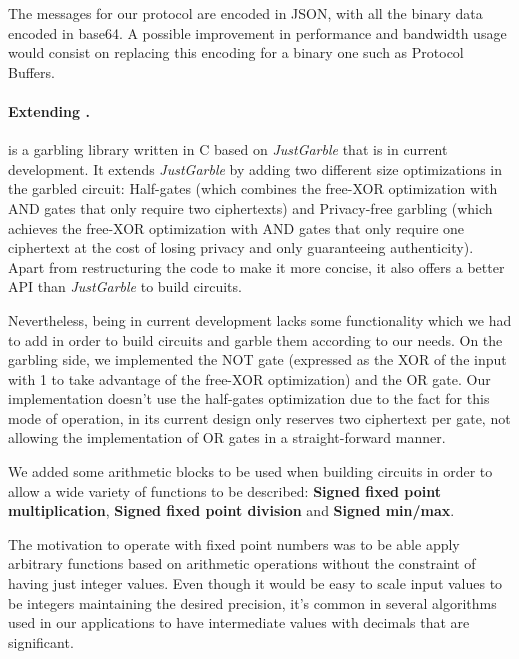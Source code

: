 The \MQTT{} messages for our protocol are encoded in JSON, with all the binary
data encoded in base64.  A possible improvement in performance and bandwidth
usage would consist on replacing this encoding for a binary one such as
Protocol Buffers.


\paragraph{Extending \libgarble.}

\libgarble{} is a garbling library written in C based on \emph{JustGarble} that
is in current development.  It extends \emph{JustGarble} by adding two
different size optimizations in the garbled circuit: Half-gates (which combines
the free-XOR optimization with AND gates that only require two ciphertexts) and
Privacy-free garbling (which achieves the free-XOR optimization with AND gates
that only require one ciphertext at the cost of losing privacy and only
guaranteeing authenticity).  Apart from restructuring the code to make it more
concise, it also offers a better API than \emph{JustGarble} to build circuits.

Nevertheless, \libgarble{} being in current development lacks some
functionality which we had to add in order to build circuits and garble them
according to our needs.  On the garbling side, we implemented the NOT gate
(expressed as the XOR of the input with 1 to take advantage of the free-XOR
optimization) and the OR gate.  Our implementation doesn't use the half-gates
optimization due to the fact for this mode of operation, \libgarble{} in its
current design only reserves two ciphertext per gate, not allowing the
implementation of OR gates in a straight-forward manner.

We added some arithmetic blocks to be used when building circuits in order to
allow a wide variety of functions to be described: \textbf{Signed fixed point
multiplication}, \textbf{Signed fixed point division} and \textbf{Signed
min/max}.

The motivation to operate with fixed point numbers was to be able apply
arbitrary functions based on arithmetic operations without the constraint of
having just integer values.  Even though it would be easy to scale input values
to be integers maintaining the desired precision, it's common in several
algorithms used in our applications to have intermediate values with decimals
that are significant.

